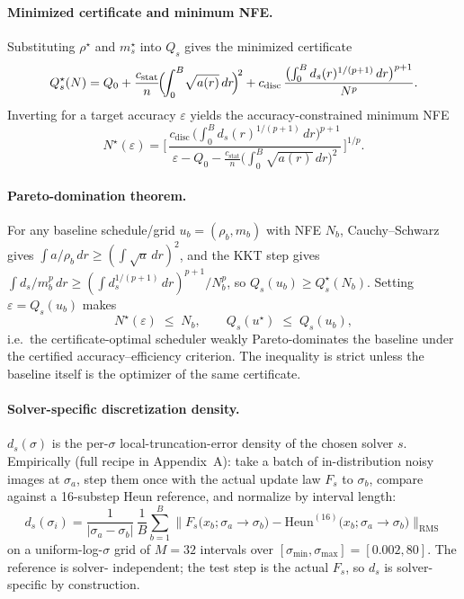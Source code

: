 \documentclass[11pt]{article}
\begin{document}
\paragraph{Minimized certificate and minimum NFE.} Substituting
\(\rho^\star\) and \(m^\star_s\) into \(Q_s\) gives the minimized
certificate
\[
Q_s^\star(N)
=
Q_0
+ \frac{c_{\mathrm{stat}}}{n}\!\Bigl(\!\int_0^B\!\sqrt{a(r)}\,dr\!\Bigr)^{\!2}
+ c_{\mathrm{disc}}\,
\frac{\bigl(\int_0^B d_s(r)^{1/(p+1)}\,dr\bigr)^{p+1}}{N^p}.
\]
Inverting for a target accuracy \(\varepsilon\) yields the
accuracy-constrained minimum NFE
\[
N^\star(\varepsilon)
=
\Biggl[\,
\frac{c_{\mathrm{disc}}\,\bigl(\int_0^B d_s(r)^{1/(p+1)}\,dr\bigr)^{p+1}}
     {\varepsilon - Q_0 - \tfrac{c_{\mathrm{stat}}}{n}\bigl(\!\int_0^B\!\sqrt{a(r)}\,dr\!\bigr)^{\!2}}
\,\Biggr]^{1/p}.
\]

\paragraph{Pareto-domination theorem.} For any baseline schedule/grid
\(u_b=(\rho_b,m_b)\) with NFE \(N_b\), Cauchy--Schwarz gives
\(\int a/\rho_b\,dr \ge (\!\int\!\sqrt{a}\,dr)^{2}\), and the KKT step
gives
\(\int d_s/m_b^p\,dr \ge (\!\int d_s^{1/(p+1)}\,dr)^{p+1}/N_b^p\),
so \(Q_s(u_b) \ge Q_s^\star(N_b)\). Setting \(\varepsilon = Q_s(u_b)\)
makes
\[
N^\star(\varepsilon) \;\le\; N_b,
\qquad
Q_s(u^\star) \;\le\; Q_s(u_b),
\]
i.e.\ the certificate-optimal scheduler weakly Pareto-dominates the
baseline under the certified accuracy--efficiency criterion. The
inequality is strict unless the baseline itself is the optimizer of the
same certificate.

\paragraph{Solver-specific discretization density.} \(d_s(\sigma)\) is
the per-\(\sigma\) local-truncation-error density of the chosen solver
\(s\). Empirically (full recipe in Appendix~A): take a batch of
in-distribution noisy images at \(\sigma_a\), step them once with the
actual update law \(F_s\) to \(\sigma_b\), compare against a
16-substep Heun reference, and normalize by interval length:
\[
\boxed{\;
d_s(\sigma_i)
=
\frac{1}{|\sigma_a-\sigma_b|}\,
\frac{1}{B}\sum_{b=1}^{B}
\bigl\| F_s\bigl(x_b;\sigma_a\!\to\!\sigma_b\bigr)
       - \mathrm{Heun}^{(16)}\bigl(x_b;\sigma_a\!\to\!\sigma_b\bigr) \bigr\|_{\mathrm{RMS}}
\;}
\]
on a uniform-log-\(\sigma\) grid of \(M=32\) intervals over
\([\sigma_{\min},\sigma_{\max}]=[0.002,80]\). The reference is solver-
independent; the test step is the actual \(F_s\), so \(d_s\) is
solver-specific by construction.
\end{document}
